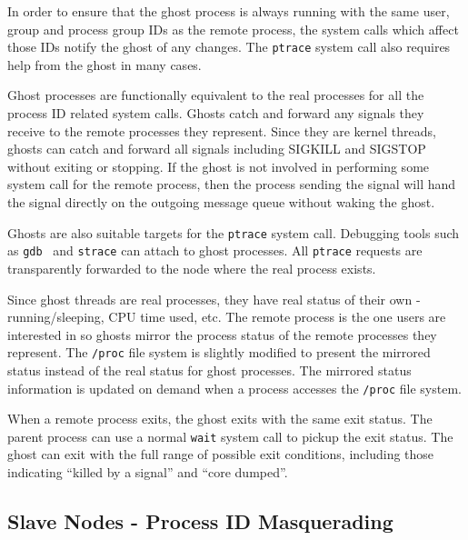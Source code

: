In order to ensure that the ghost process is always running with the
same user, group and process group IDs as the remote process, the
system calls which affect those IDs notify the ghost of any changes.
The \texttt{ptrace} system call also requires help from the ghost in
many cases.


Ghost processes are functionally equivalent to the real processes for
all the process ID related system calls.  Ghosts catch and forward any
signals they receive to the remote processes they represent.  Since
they are kernel threads, ghosts can catch and forward all signals
including SIGKILL and SIGSTOP without exiting or stopping.  If the
ghost is not involved in performing some system call for the remote
process, then the process sending the signal will hand the signal
directly on the outgoing message queue without waking the ghost.

Ghosts are also suitable targets for the \texttt{ptrace} system call.
Debugging tools such as \texttt{gdb}~\cite{gdb} and \texttt{strace}
can attach to ghost processes.  All \texttt{ptrace} requests are
transparently forwarded to the node where the real process exists.

Since ghost threads are real processes, they have real status of their
own - running/sleeping, CPU time used, etc.  The remote process is the
one users are interested in so ghosts mirror the process status of the
remote processes they represent.  The \texttt{/proc} file system is
slightly modified to present the mirrored status instead of the real
status for ghost processes.  The mirrored status information is
updated on demand when a process accesses the \texttt{/proc} file
system.

When a remote process exits, the ghost exits with the same exit
status.  The parent process can use a normal \texttt{wait} system
call to pickup the exit status.  The ghost can exit with the full
range of possible exit conditions, including those indicating ``killed
by a signal'' and ``core dumped''.


\subsection{Slave Nodes - Process ID Masquerading}

